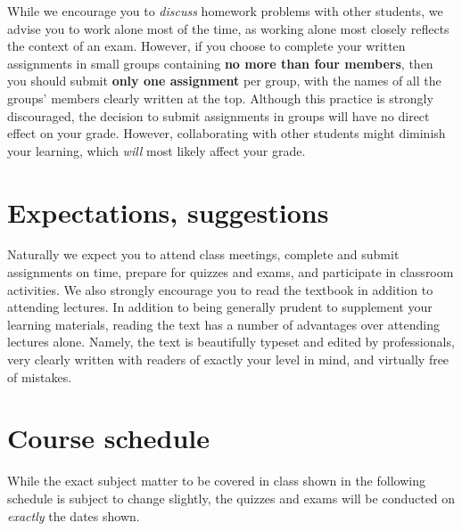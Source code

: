 \documentclass[11pt]{article}
\begin{document}
While we encourage you to {\em discuss} homework problems with other
students, we advise you to work alone most of the time,
as working alone most closely reflects the context of an exam.
However, if you choose to complete your written assignments in small
groups containing {\bf no more than four members}, then you should
submit {\bf only one assignment} per group, with the names of all
the groups' members clearly written at the top.  Although this
practice is strongly discouraged, the decision to submit assignments
in groups will have no direct effect on your grade. However,
collaborating with other students might diminish your learning,
which {\em will} most likely affect your grade.

\section{Expectations, suggestions} Naturally we expect you to attend 
class meetings, complete and submit assignments on 
time, prepare for quizzes and exams, and participate in classroom 
activities. We also strongly encourage you to read the textbook
in addition to attending lectures.
In addition to being generally prudent to 
supplement your learning materials, reading the text has a number of 
advantages over attending lectures alone. Namely, the text is beautifully 
typeset and edited by professionals, very clearly written with readers 
of exactly your level in mind, and virtually free of mistakes.

\section{Course schedule}\label{Schedule} While the exact subject
matter to be covered in class shown in the following schedule is
subject to change slightly, the quizzes and exams will be conducted
on {\em exactly} the dates shown.
\end{document}
